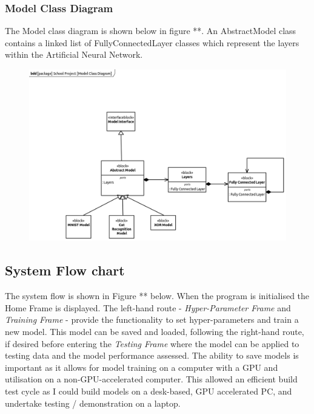 \documentclass[./project-report/src/latex/project-report.tex]{subfiles}
\begin{document}
\subsubsection{Model Class Diagram}

The  Model class diagram is shown below in figure **. An AbstractModel class contains a linked list of FullyConnectedLayer classes which represent the layers within the 
Artificial Neural Network.

\begin{figure}[h!]
\centering
\includegraphics[width=1\textwidth]{./project-report/src/images/model-class-diagram.png}
\end{figure}

\pagebreak

\subsection{System Flow chart}

The system flow is shown in Figure ** below. When the program is initialised the Home Frame is displayed. The left-hand route - \textit{Hyper-Parameter Frame} and 
\textit{Training Frame} - provide the functionality to set hyper-parameters and train a new model. This model can be saved and loaded, following the right-hand route, 
if desired before entering the \textit{Testing Frame} where the model can be applied to testing data and the model performance assessed. The ability to save models is 
important as it allows for model training on a computer with a GPU and utilisation on a non-GPU-accelerated computer. This allowed an efficient build test cycle as I could 
build models on a desk-based, GPU accelerated PC, and undertake testing / demonstration on a laptop.
\end{document}
